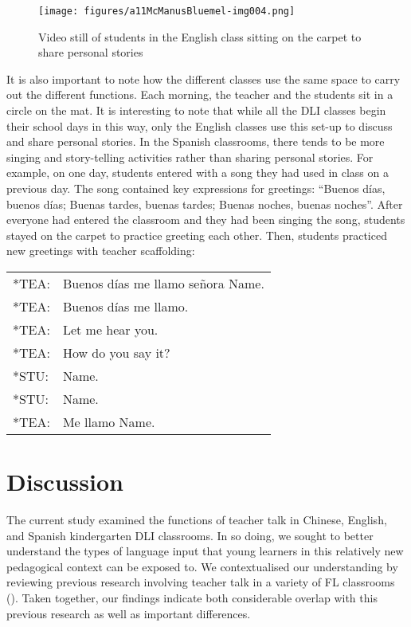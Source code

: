 \documentclass[output=paper,chinesefont]{langscibook}
\begin{document}
\begin{figure}
\texttt{[image: figures/a11McManusBluemel-img004.png]}
\caption{Video still of students in the English class sitting on the carpet to share personal stories\label{fig:mcmanus:2}}
\end{figure}

It is also important to note how the different classes use the same space to carry out the different functions. Each morning, the teacher and the students sit in a circle on the mat. It is interesting to note that while all the DLI classes begin their school days in this way, only the English classes use this set-up to discuss and share personal stories. In the Spanish classrooms, there tends to be more singing and story-telling activities rather than sharing personal stories. For example, on one day, students entered with a song they had used in class on a previous day. The song contained key expressions for greetings: ``Buenos días, buenos días; Buenas tardes, buenas tardes; Buenas noches, buenas noches''. After everyone had entered the classroom and they had been singing the song, students stayed on the carpet to practice greeting each other. Then, students practiced new greetings with teacher scaffolding:

\ea
\begin{tabular}[t]{@{}ll@{}}
*TEA: & Buenos días me llamo señora Name.\\
*TEA: & Buenos días me llamo.\\
*TEA: & Let me hear you.\\
*TEA: & How do you say it?\\
*STU: & Name.\\
*STU: & Name.\\
*TEA: & Me llamo Name.\\
\end{tabular}
\z

\section{Discussion}

The current study examined the functions of teacher talk in Chinese, English, and Spanish kindergarten DLI classrooms. In so doing, we sought to better understand the types of language input that young learners in this relatively new pedagogical context can be exposed to. We contextualised our understanding by reviewing previous research involving teacher talk in a variety of FL classrooms (\citealt{CollinsEtAl2012,Huensch2019,Jia2017,LiEtAl2016}). Taken together, our findings indicate both considerable overlap with this previous research as well as important differences.
\end{document}
